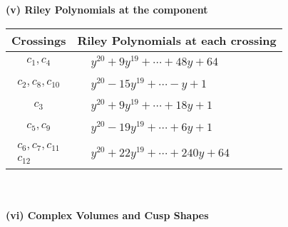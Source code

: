 \documentclass[1p]{elsarticle_modified}
\theoremstyle{definition}
\begin{document}
\newpage\renewcommand{\arraystretch}{1}
\flushleft \textbf{(v) Riley Polynomials at the component}\newline \\
\begin{tabular}{m{50pt}|m{274pt}}
Crossings & \hspace{64pt}Riley Polynomials at each crossing \\
\hline $$\begin{aligned}c_{1},c_{4}\end{aligned}$$&$\begin{aligned}
&y^{20}+9 y^{19}+\cdots+48 y+64
\end{aligned}$\\
\hline $$\begin{aligned}c_{2},c_{8},c_{10}\end{aligned}$$&$\begin{aligned}
&y^{20}-15 y^{19}+\cdots- y+1
\end{aligned}$\\
\hline $$\begin{aligned}c_{3}\end{aligned}$$&$\begin{aligned}
&y^{20}+9 y^{19}+\cdots+18 y+1
\end{aligned}$\\
\hline $$\begin{aligned}c_{5},c_{9}\end{aligned}$$&$\begin{aligned}
&y^{20}-19 y^{19}+\cdots+6 y+1
\end{aligned}$\\
\hline $$\begin{aligned}c_{6},c_{7},c_{11}\\c_{12}\end{aligned}$$&$\begin{aligned}
&y^{20}+22 y^{19}+\cdots+240 y+64
\end{aligned}$\\
\hline
\end{tabular}\\~\\
\newpage\flushleft \textbf{(vi) Complex Volumes and Cusp Shapes}
\end{document}
